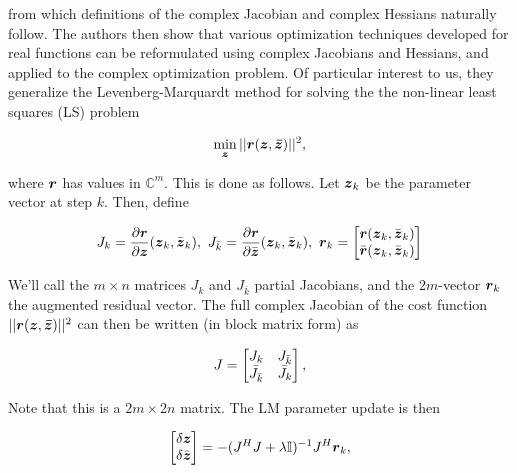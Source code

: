 \documentclass[useAMS,usenatbib]{mn2e}
\newcommand{\CC}{\mathbb{C}}
\newcommand{\II}{\mathbb{I}}
\newcommand{\zz}{\bmath{z}}
\newcommand{\JJ}{J} %
\begin{document}
from which definitions of the complex Jacobian and complex Hessians naturally follow. The authors then show 
that various optimization techniques developed for real functions can be reformulated using 
complex Jacobians and Hessians, and applied to the complex optimization problem. Of particular interest to 
us, they generalize the Levenberg-Marquardt method for solving the the non-linear least squares (LS) problem

\begin{equation}
\label{eq:LSmin}
\min_{\bmath{z}} ||\bmath{r}(\bmath{z},\bmath{\bar z})||^2,
\end{equation}

where $\bmath{r}$ has values in $\CC^m$. This is done as follows.
Let $\zz_k$ be the parameter vector at step $k$. Then, define

\newcommand{\Matrix}[2]{\left [ \begin{array}{@{}#1@{}}#2\end{array} \right ]}
\newcommand{\Stack}[1]{\begin{array}{@{}c@{}}#1\end{array}}

\begin{equation}
\label{eq:Jk}
J_k=\frac{\partial \bmath{r}}{\partial \zz} (\zz_k,\bar{\zz}_k), ~J_{\bar{k}}=\frac{\partial \bmath{r}}{\partial \bar{\zz}}(\zz_k,\bar{\zz}_k),~\bmath{r}_k=\Matrix{c}{\bmath{r}(\zz_k,\bar{\zz}_k)\\\bar{\bmath{r}}(\zz_k,\bar{\zz}_k)}
\end{equation}

We'll call the $m\times n$ matrices $J_k$ and $J_{\bar{k}}$ partial Jacobians, and the $2m$-vector $\bmath{r}_k$ the 
augmented residual vector. The full complex Jacobian of the cost function $||\bmath{r}(\bmath{z},\bmath{\bar z})||^2$ can then be
written (in block matrix form) as

\begin{equation}
\label{eq:JJ}
\JJ = \Matrix{cc}{J_k & J_{\bar{k}} \\ \bar{J}_{\bar{k}} & \bar{J}_k },
\end{equation}

Note that this is a $2m \times 2n$ matrix. The LM parameter update is then

\begin{equation}
\label{eq:LM}
\Matrix{c}{\delta \zz \\ \delta \bar{\zz}} = -(\JJ^H \JJ + \lambda\II)^{-1}\JJ^H \bmath{r}_k,
\end{equation}
\end{document}
